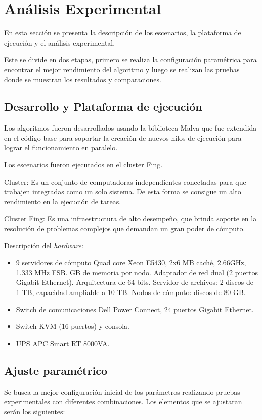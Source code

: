\chapter{Análisis Experimental}
En esta sección se presenta la descripción de los escenarios, la plataforma de ejecución y el análisis experimental.

Este se divide en dos etapas, primero se realiza la configuración paramétrica para encontrar el mejor rendimiento del algoritmo y luego se realizan las pruebas donde se muestran los resultados y comparaciones.


\section{Desarrollo y Plataforma de ejecución }
Los algoritmos fueron desarrollados usando la biblioteca Malva que fue extendida en el código base para soportar la creación de nuevos hilos de ejecución para lograr el funcionamiento en paralelo.

Los escenarios fueron ejecutados en el cluster Fing.

Cluster: Es un conjunto de computadoras independientes conectadas para que trabajen integradas como un solo sistema. De esta forma se consigue un alto rendimiento en la ejecución de tareas. 

Cluster Fing: Es una infraestructura de alto desempeño, que brinda soporte en la resolución de problemas complejos que demandan un gran poder de cómputo.

Descripción del \emph{hardware}: 
\begin{itemize}
	\item 9 servidores de cómputo
	\subitem Quad core Xeon E5430, 2x6 MB caché, 2.66GHz, 1.333 MHz FSB.
	 GB de memoria por nodo.
	\subitem Adaptador de red dual (2 puertos Gigabit Ethernet).
	\subitem  Arquitectura de 64 bits.
	\subitem Servidor de archivos: 2 discos de 1 TB, capacidad ampliable a 10 TB.
	\subitem Nodos de cómputo: discos de 80 GB.
	\item Switch de comunicaciones
	\subitem Dell Power Connect, 24 puertos Gigabit Ethernet.
	\item Switch KVM (16 puertos) y consola.
	\item UPS APC Smart RT 8000VA.
\end{itemize}

\section{Ajuste paramétrico}
Se busca la mejor configuración inicial de los parámetros realizando pruebas experimentales con diferentes combinaciones.  
Los elementos que se ajustaran serán los siguientes:

